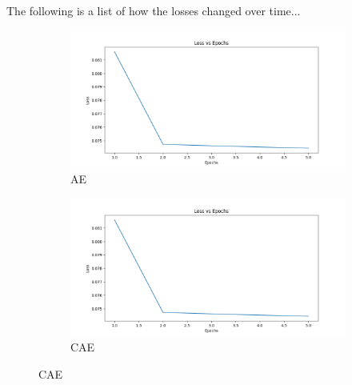 The following is a list of how the losses changed over time...


\begin{figure}[!h]
  \begin{subfigure}[t]{.5\textwidth}
    \centering
    \includegraphics[width=\linewidth]{figures/loss.png}
    \caption{AE}
  \end{subfigure}
  \hfill
  \begin{subfigure}[t]{.5\textwidth}
    \centering
    \includegraphics[width=\linewidth]{figures/loss.png}
    \caption{CAE}
  \end{subfigure}

  \medskip


\end{figure}
